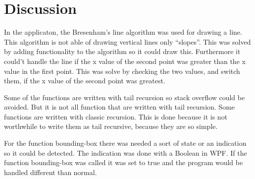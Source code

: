\chapter{Discussion}
\label{chp:disc}

In the applicaton, the Bresenham’s line algorithm was used for drawing a line. This algorithm is not able of drawing vertical lines only “slopes”. This was solved by adding functionality to the algorithm so it could draw this. Furthermore it could't handle the line if the x value of the second point was greater than the x value in the first point. This was solve by checking the two values, and switch them, if the x value of the second point was greatest.

Some of the functions are written with tail recursion so stack overflow could be avoided. But it is not all function that are written with tail recursion. Some functions  are written with classic recursion. This is done because it is not worthwhile to write them as tail recursive, because they are so simple.

For the function bounding-box there was needed a sort of state or an indication so it could be detected. The indication was done with a Boolean in WPF. If the function bounding-box was called it was set to true and the program would be handled different than normal.
